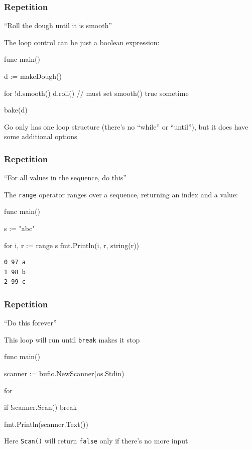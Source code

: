 \documentclass[handout,compress,t,11pt]{beamer}
\begin{document}
\begin{frame}[fragile]
    \frametitle{Repetition}
    ``Roll the dough until it is smooth'' \par
    \vspace{0.5\baselineskip}
    The loop control can be just a boolean expression:
\begin{golang}
func main() {
    d := makeDough()

    for !d.smooth() {
        d.roll()       // must set smooth() true sometime
    }
    
    bake(d)
}
\end{golang}
    \vspace{0.5\baselineskip}
Go only has one loop structure (there's no ``while'' or ``until''), but it
does have some additional options
\end{frame}

\begin{frame}[fragile]
    \frametitle{Repetition}
    ``For all values in the sequence, do this'' \par
    \vspace{0.5\baselineskip}
    The \verb|range| operator ranges over a sequence, returning an index and a value:
\begin{golang}
func main() {
    s := "abc"

    for i, r := range s {
        fmt.Println(i, r, string(r))
    }
}
\end{golang}
\vspace{0.5\baselineskip}
\begin{verbatim}
0 97 a
1 98 b
2 99 c
\end{verbatim}
\end{frame}

\begin{frame}[fragile]
    \frametitle{Repetition}
    ``Do this forever'' \par
    \vspace{0.5\baselineskip}
    This loop will run until \verb|break| makes it stop
\begin{golang}
func main() {
    scanner := bufio.NewScanner(os.Stdin)

    for {
        if !scanner.Scan() {
            break
        }

        fmt.Println(scanner.Text())
    }
}
\end{golang}
    \vspace{0.5\baselineskip}
Here \verb|Scan()| will return \verb|false| only if there's no more input
\end{frame}
\end{document}
